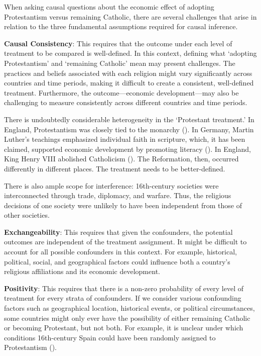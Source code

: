 \documentclass[
  single column]{article}
\begin{document}
When asking causal questions about the economic effect of adopting
Protestantism versus remaining Catholic, there are several challenges
that arise in relation to the three fundamental assumptions required for
causal inference.

\textbf{Causal Consistency}: This requires that the outcome under each
level of treatment to be compared is well-defined. In this context,
defining what `adopting Protestantism' and `remaining Catholic' mean may
present challenges. The practices and beliefs associated with each
religion might vary significantly across countries and time periods,
making it difficult to create a consistent, well-defined treatment.
Furthermore, the outcome---economic development---may also be
challenging to measure consistently across different countries and time
periods.

There is undoubtedly considerable heterogeneity in the `Protestant
treatment.' In England, Protestantism was closely tied to the monarchy
(). In Germany, Martin
Luther's teachings emphasized individual faith in scripture, which, it
has been claimed, supported economic development by promoting literacy
(). In England,
King Henry VIII abolished Catholicism
(). The Reformation, then,
occurred differently in different places. The treatment needs to be
better-defined.

There is also ample scope for interference: 16th-century societies were
interconnected through trade, diplomacy, and warfare. Thus, the
religious decisions of one society were unlikely to have been
independent from those of other societies.

\textbf{Exchangeability}: This requires that given the confounders, the
potential outcomes are independent of the treatment assignment. It might
be difficult to account for all possible confounders in this context.
For example, historical, political, social, and geographical factors
could influence both a country's religious affiliations and its economic
development.

\textbf{Positivity}: This requires that there is a non-zero probability
of every level of treatment for every strata of confounders. If we
consider various confounding factors such as geographical location,
historical events, or political circumstances, some countries might only
ever have the possibility of either remaining Catholic or becoming
Protestant, but not both. For example, it is unclear under which
conditions 16th-century Spain could have been randomly assigned to
Protestantism ().
\end{document}
